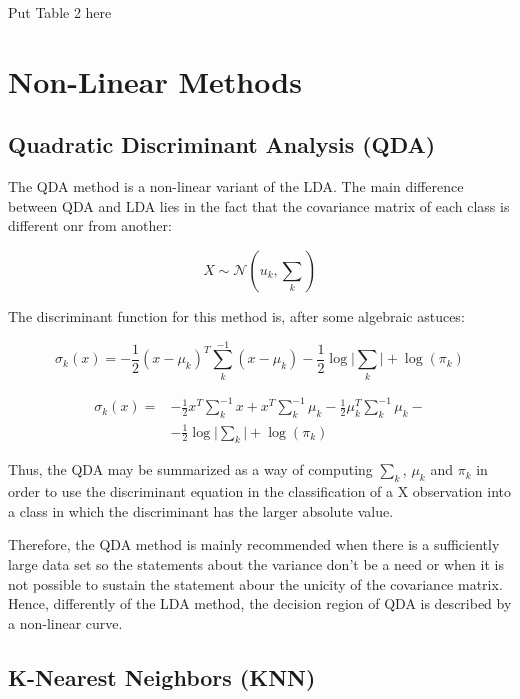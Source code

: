 \documentclass[conference]{IEEEtran}
\newcommand{\reviewUrgent}[1]{{\color{red} #1}} %
\begin{document}
\reviewUrgent{Put Table 2 here}


\section{Non-Linear Methods}

\subsection{Quadratic Discriminant Analysis (QDA)}

The QDA method is a non-linear variant of the LDA. The main difference between QDA and LDA
lies in the fact that the covariance matrix of each class is different onr from another:

\begin{equation}
    X \sim  \mathcal{N}(u_k, \textstyle \sum_k)\label{eq13}
\end{equation}

The discriminant function for this method is, after some algebraic astuces:

\begin{equation}
    \sigma_k(x) = -\frac{1}{2}(x-\mu_k)^T\sum^{-1}_k(x-\mu_k) - \frac{1}{2}\log \lvert\sum_k\rvert +\log(\pi_k) \label{eq14}
\end{equation}

\begin{equation}
\begin{aligned}
    \sigma_k(x) = {} 
    & -\frac{1}{2}x^T\sum^{-1}_kx + x^T\sum^{-1}_k\mu_k -  \frac{1}{2}\mu_k^T\sum^{-1}_k\mu_k - \\ 
    & - \frac{1}{2}\log \lvert\sum_k\rvert +\log(\pi_k) \label{eq15}
\end{aligned}
\end{equation}

Thus, the QDA may be summarized as a way of computing $\sum_k$, $\mu_k$ and $\pi_k$ 
in order to use the discriminant equation in the classification of a X observation into a class
in which the discriminant has the larger absolute value.  

Therefore, the QDA method is mainly recommended when there is a sufficiently large data set
so the statements about the variance don't be a need or when it is not possible to 
sustain the statement abour the unicity of the covariance matrix. Hence, differently 
of the LDA method, the decision region of QDA is described by a non-linear curve. 

\subsection{K-Nearest Neighbors (KNN)}
\end{document}
